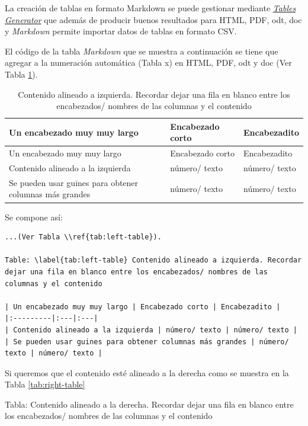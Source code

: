 \documentclass[
]{book}
\begin{document}
La creación de tablas en formato Markdown se puede gestionar mediante \href{https://www.tablesgenerator.com/markdown_tables}{\emph{Tables Generator}} que además de producir buenos resultados para HTML, PDF, odt, doc y \emph{Markdown} permite importar datos de tablas en formato CSV.

El código de la tabla \emph{Markdown} que se muestra a continuación se tiene que agregar a la numeración automática (Tabla x) en HTML, PDF, odt y doc (Ver Tabla \ref{tab:left-table}).

\begin{longtable}[]{@{}
  >{\raggedright\arraybackslash}p{}
  >{\raggedright\arraybackslash}p{}
  >{\raggedright\arraybackslash}p{}@{}}
\caption{\label{tab:left-table} Contenido alineado a izquierda. Recordar dejar una fila en blanco entre los encabezados/ nombres de las columnas y el contenido}\tabularnewline
\toprule
Un encabezado muy muy largo & Encabezado corto & Encabezadito \\
\midrule
\endfirsthead
\toprule
Un encabezado muy muy largo & Encabezado corto & Encabezadito \\
\midrule
\endhead
Contenido alineado a la izquierda & número/ texto & número/ texto \\
Se pueden usar guines para obtener columnas más grandes & número/ texto & número/ texto \\
\bottomrule
\end{longtable}

Se compone así:

\begin{verbatim}
...(Ver Tabla \\ref{tab:left-table}).

Table: \label{tab:left-table} Contenido alineado a izquierda. Recordar dejar una fila en blanco entre los encabezados/ nombres de las columnas y el contenido

| Un encabezado muy muy largo | Encabezado corto | Encabezadito |
|:---------|:---|:---|
| Contenido alineado a la izquierda | número/ texto | número/ texto |
| Se pueden usar guines para obtener columnas más grandes | número/ texto | número/ texto |
\end{verbatim}

Si queremos que el contenido esté alineado a la derecha como se muestra en la Tabla \ref{tab:right-table}

Tabla: \label{tab:right-table} Contenido alineado a la derecha. Recordar dejar una fila en blanco entre los encabezados/ nombres de las columnas y el contenido
\end{document}
